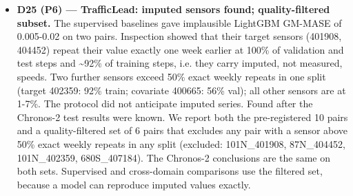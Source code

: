 \begin{itemize}
\item \textbf{D25 (P6) — TrafficLead: imputed sensors found; quality-filtered subset.} The supervised baselines gave implausible LightGBM GM-MASE of 0.005-0.02 on two pairs. Inspection showed that their target sensors (401908, 404452) repeat their value exactly one week earlier at 100\% of validation and test steps and \textasciitilde{}92\% of training steps, i.e. they carry imputed, not measured, speeds. Two further sensors exceed 50\% exact weekly repeats in one split (target 402359: 92\% train; covariate 400665: 56\% val); all other sensors are at 1-7\%. The protocol did not anticipate imputed series. Found after the Chronos-2 test results were known. We report both the pre-registered 10 pairs and a quality-filtered set of 6 pairs that excludes any pair with a sensor above 50\% exact weekly repeats in any split (excluded: 101N\_401908, 87N\_404452, 101N\_402359, 680S\_407184). The Chronos-2 conclusions are the same on both sets. Supervised and cross-domain comparisons use the filtered set, because a model can reproduce imputed values exactly.
\end{itemize}